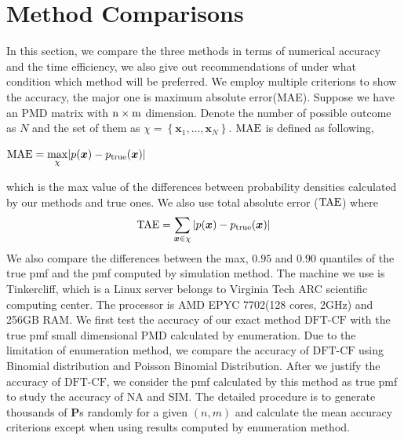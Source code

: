 \documentclass[12pt]{article}
\newcommand{\Pmat}{\mathbf{P}}
\newcommand{\TAE}{{\rm TAE}}
\newcommand{\MAE}{{\rm MAE}}
\newcommand{\PMD}{\textrm{PMD}}
\newcommand{\xvec}{\boldsymbol{x}}
\newcommand{\SIM}{{\textrm{SIM}}}
\newcommand{\NA}{{\textrm{NA}}}
\newcommand{\dft}{{\textrm{DFT-CF}}}
\begin{document}
\section{Method Comparisons}\label{sec:Method Comparisons}
In this section, we compare the three methods in terms of numerical accuracy and the time efficiency, we also give out recommendations of under what condition which method will be preferred. We employ multiple criterions to show the accuracy, the major one is maximum absolute error(MAE). Suppose we have an PMD matrix with $\rm n\times m$ dimension. Denote the number of possible outcome as $N$ and the set of them as $\chi = \left\{\xvec_1,\dots, \xvec_{N}\right\}$. $\MAE$ is defined as following,
\begin{center}
$\mathrm{\MAE} = \underset{\chi}{\max}|p(\xvec) - p_{\text{true}}(\xvec)|$
\end{center}
which is the max value of the differences between probability densities calculated by our methods and true ones.
We also use total absolute error ($\TAE$)  where
\begin{equation*}
    \mbox{\TAE} = \sum_{\xvec \in \chi} |p(\xvec) - p_{\text{true}}(\xvec)|
\end{equation*}
We also compare the differences between the max, $0.95$ and $0.90$ quantiles of the true pmf and the pmf computed by simulation method. The machine we use is Tinkercliff, which is a Linux server belongs to Virginia Tech ARC scientific computing center. The processor is AMD EPYC 7702(128 cores, 2GHz) and 256GB RAM. We first test the accuracy of our exact method $\dft$ with the true pmf small dimensional $\PMD$ calculated by enumeration. Due to the limitation of enumeration method, we compare the accuracy of $\dft$ using Binomial distribution and Poisson Binomial Distribution. %
After we justify the accuracy of $\dft$, we consider the pmf calculated by this method as true pmf to study the accuracy of $\NA$ and $\SIM$. The detailed procedure is to generate thousands of $\Pmat$s randomly for a given $(n,m)$ and calculate the mean accuracy criterions except when using results computed by enumeration method.






\end{document}
